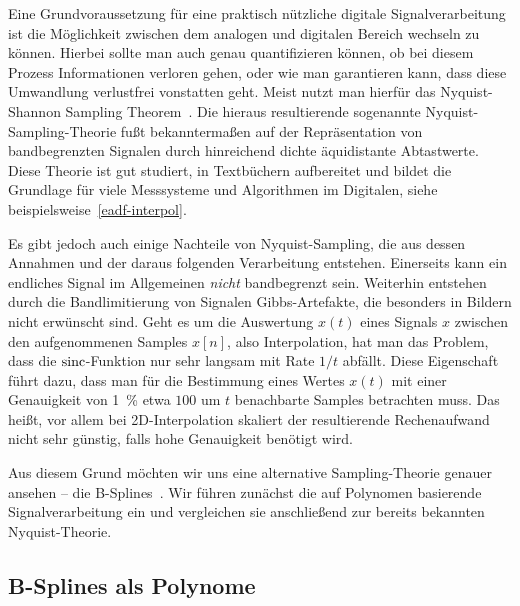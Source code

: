 %
Eine Grundvoraussetzung f\"ur eine praktisch n\"utzliche digitale Signalverarbeitung ist die M\"oglichkeit zwischen dem analogen und digitalen Bereich wechseln zu k\"onnen. Hierbei sollte man auch genau quantifizieren k\"onnen, ob bei diesem Prozess Informationen verloren gehen, oder wie man garantieren kann, dass diese Umwandlung verlustfrei vonstatten geht. Meist nutzt man hierf\"ur das Nyquist-Shannon Sampling Theorem~\cite[Kapitel~1.4.2]{proakis2013}. Die hieraus resultierende sogenannte Nyquist-Sampling-Theorie fu{\ss}t bekannterma{\ss}en auf der Repr\"asentation von bandbegrenzten Signalen durch hinreichend dichte \"aquidistante Abtastwerte. Diese Theorie ist gut studiert, in Textb\"uchern aufbereitet und bildet die Grundlage f\"ur viele Messsysteme und Algorithmen im Digitalen, siehe beispielsweise~\cref{eadf-interpol}.

Es gibt jedoch auch einige Nachteile von Nyquist-Sampling, die aus dessen Annahmen und der daraus folgenden Verarbeitung entstehen. Einerseits kann ein endliches Signal im Allgemeinen \emph{nicht} bandbegrenzt sein. Weiterhin entstehen durch die Bandlimitierung von Signalen Gibbs-Artefakte, die besonders in Bildern nicht erw\"unscht sind. Geht es um die Auswertung $x(t)$ eines Signals $x$ zwischen den aufgenommenen Samples $x[n]$, also Interpolation, hat man das Problem, dass die $\operatorname*{sinc}$-Funktion nur sehr langsam mit Rate $1/t$ abf\"allt. Diese Eigenschaft f\"uhrt dazu, dass man f\"ur die Bestimmung eines Wertes $x(t)$ mit einer Genauigkeit von \SI{1}{\percent} etwa $100$ um $t$ benachbarte Samples betrachten muss. Das hei{\ss}t, vor allem bei 2D-Interpolation skaliert der resultierende Rechenaufwand nicht sehr g\"unstig, falls hohe Genauigkeit ben\"otigt wird.

Aus diesem Grund m\"ochten wir uns eine alternative Sampling-Theorie genauer ansehen -- die B-Splines~\cite{unser1999splines_mag}. Wir f\"uhren zun\"achst die auf Polynomen basierende Signalverarbeitung ein und vergleichen sie anschlie{\ss}end zur bereits bekannten Nyquist-Theorie.

\subsection{B-Splines als Polynome}

